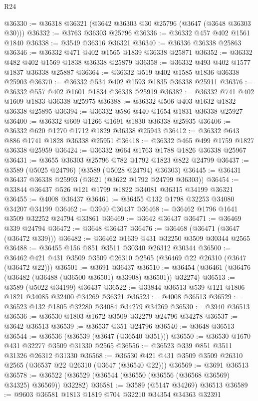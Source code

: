 \begin{lexlean}{R24}
\begin{coremodule}
@36330 := @36318 @36321 (@3642 @36303 @30 @25796 (@3647 (@3648 @36303 @30)))
@36332 := @3763 @36303 @25796
@36336 := @36332 @457 @402 @1561 @1840
@36338 := @3549 @36316 @36321
@36340 := @36336 @36338 @25863
@36346 := @36332 @471 @402 @1565 @1839 @36338 @25871
@36352 := @36332 @482 @402 @1569 @1838 @36338 @25879
@36358 := @36332 @493 @402 @1577 @1837 @36338 @25887
@36364 := @36332 @519 @402 @1585 @1836 @36338 @25903
@36370 := @36332 @534 @402 @1593 @1835 @36338 @25911
@36376 := @36332 @557 @402 @1601 @1834 @36338 @25919
@36382 := @36332 @741 @402 @1609 @1833 @36338 @25975
@36388 := @36332 @506 @403 @1632 @1832 @36338 @25895
@36394 := @36332 @586 @440 @1654 @1831 @36338 @25927
@36400 := @36332 @609 @1266 @1691 @1830 @36338 @25935
@36406 := @36332 @620 @1270 @1712 @1829 @36338 @25943
@36412 := @36332 @643 @886 @1741 @1828 @36338 @25951
@36418 := @36332 @465 @499 @1759 @1827 @36338 @25959
@36424 := @36332 @664 @1763 @1788 @1826 @36338 @25967
@36431 := @3655 @36303 @25796 @782 @1792 @1823 @822 @24799
@36437 := @3589 (@5025 @24796) (@3589 (@5028 @24794) @36303)
@36445 := @36431 @36437 @36338 @25993 (@3621 (@3622 @1792 @24799 @36303))
@36454 := @33844 @36437 @526 @121 @1799 @1822 @34081 @36315 @34199 @36321
@36455 := @4008 @36437
@36461 := @36455 @132 @1798 @32253 @34080 @34207 @34199
@36462 := @3940 @36437
@36468 := @36462 @1796 @1641 @3509 @32252 @24794 @33861
@36469 := @3642 @36437
@36471 := @36469 @339 @24794
@36472 := @3648 @36437
@36476 := @36468 (@36471 (@3647 (@36472 @339)))
@36482 := @36462 @1639 @431 @32250 @3509 @30344 @2565
@36488 := @36455 @156 @851 @3511 @30340 @26312 @30344
@36500 := @36462 @421 @431 @3509 @3509 @26310 @2565 (@36469 @22 @26310 (@3647 (@36472 @22)))
@36501 := @3691 @36437
@36510 := @36454 (@36461 (@36476 (@36482 (@36488 (@36500 @36501) @33908) @36501)) @32274)
@36513 := @3589 (@5022 @34199) @36437
@36522 := @33844 @36513 @539 @121 @1806 @1821 @34085 @32400 @34269 @36321
@36523 := @4008 @36513
@36529 := @36523 @132 @1805 @32280 @34084 @34279 @34269
@36530 := @3940 @36513
@36536 := @36530 @1803 @1672 @3509 @32279 @24796 @34278
@36537 := @3642 @36513
@36539 := @36537 @351 @24796
@36540 := @3648 @36513
@36544 := @36536 (@36539 (@3647 (@36540 @351)))
@36550 := @36530 @1670 @431 @32277 @3509 @31330 @2565
@36556 := @36523 @339 @851 @3511 @31326 @26312 @31330
@36568 := @36530 @421 @431 @3509 @3509 @26310 @2565 (@36537 @22 @26310 (@3647 (@36540 @22)))
@36569 := @3691 @36513
@36578 := @36522 (@36529 (@36544 (@36550 (@36556 (@36568 @36569) @34325) @36569)) @32282)
@36581 := @3589 (@5147 @34269) @36513
@36589 := @9603 @36581 @1813 @1819 @704 @32210 @34354 @34363 @32391

\end{coremodule}
\end{lexlean}
